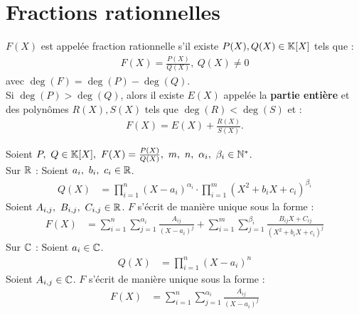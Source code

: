 \section{Fractions rationnelles}
\begin{definition}
	$F(X)$ est appelée fraction rationnelle s'il existe $P(X), Q(X) \in \mathbb{K}[X]$ tels que :
	\begin{align*}
		F(X) = \frac{P(X)}{Q(X)},\ Q(X) \neq 0
	\end{align*}
	avec $\deg(F) = \deg(P) - \deg(Q)$. \\
	Si $\deg(P) > \deg(Q)$, alors il existe $E(X)$ appelée la \textbf{partie entière} et des polynômes $R(X), S(X)$ tels que $\deg(R) < \deg(S)$ et : 
	\begin{align*}
		F(X) = E(X) + \frac{R(X)}{S(X)}.
	\end{align*}
\end{definition}

\begin{theorem}
	Soient $P,\ Q \in \mathbb{K}[X],\ F(X) = \frac{P(X)}{Q(X)},\ m,\ n,\ \alpha_i,\ \beta_i \in \mathbb{N}^*$.
	\\
	Sur $\mathbb{R}$ : Soient $a_i,\ b_i,\ c_i \in \mathbb{R}$.
	\begin{align*}
		Q(X) &= \prod_{i = 1}^{n} (X - a_i)^{\alpha_i} \cdot \prod_{i = 1}^{m} (X^2 + b_i X + c_i)^{\beta_i}
	\end{align*}
	Soient $A_{i,j},\ B_{i,j},\ C_{i,j} \in \mathbb{R}$. $F$ s'écrit de manière unique sous la forme :
	\begin{align*}
        F(X) &=  \sum_{i = 1}^{n} \sum_{j = 1}^{\alpha_i} \frac{A_{ij}}{\left(X - a_i\right)^{j} } + \sum_{i = 1}^{m} \sum_{j = 1}^{\beta_i} \frac{B_{ij}X + C_{ij}}{(X^2 + b_iX + c_i)^{j}} 
	\end{align*}
	Sur $\mathbb{C}$ : Soient $a_i \in \mathbb{C}$.
	\begin{align*}
		Q(X) &= \prod_{i = 1}^{n} (X - a_i)^{n}
	\end{align*}
	Soient $A_{i,j} \in \mathbb{C}$. $F$ s'écrit de manière unique sous la forme :
	\begin{align*}
        F(X) &=  \sum_{i = 1}^{n} \sum_{j = 1}^{\alpha_i} \frac{A_{ij}}{\left(X - a_i\right)^{j} }
	\end{align*}    
\end{theorem}

